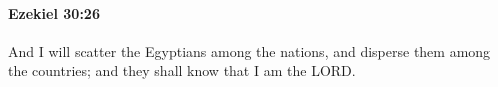 
		\paragraph{Ezekiel 30:26} %
			\label{EZEKIEL-30-26}

			And I will scatter the Egyptians among the nations, and disperse them among the countries; and they shall know that I am the LORD.

